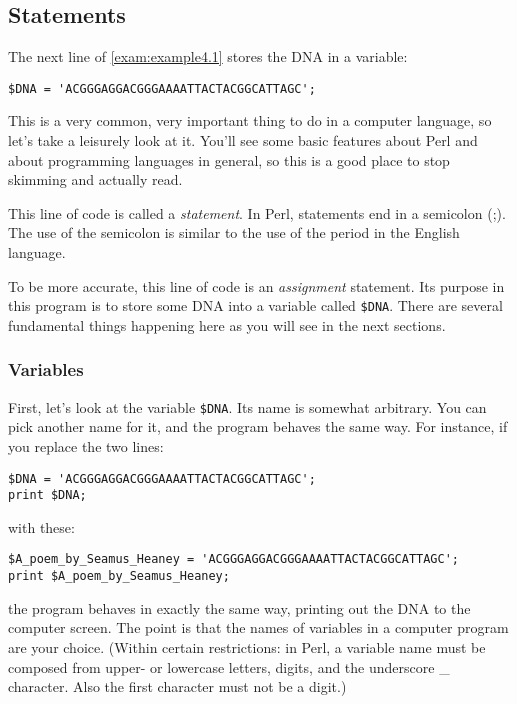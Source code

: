 \subsection{Statements}
The next line of \autoref{exam:example4.1} stores the DNA in a variable:

\begin{lstlisting}
$DNA = 'ACGGGAGGACGGGAAAATTACTACGGCATTAGC';
\end{lstlisting}

This is a very common, very important thing to do in a computer language, so let's take a leisurely look at it. You'll see some basic features about Perl and about programming languages in general, so this is a good place to stop skimming and actually read.

This line of code is called a \textit{statement}. In Perl, statements end in a semicolon (;). The use of the semicolon is similar to the use of the period in the English language.

To be more accurate, this line of code is an \textit{assignment} statement. Its purpose in this program is to store some DNA into a variable called \verb|$DNA|. There are several fundamental things happening here as you will see in the next sections. 

\subsubsection{Variables}
First, let's look at the variable \verb|$DNA|. Its name is somewhat arbitrary. You can pick another name for it, and the program behaves the same way. For instance, if you replace the two lines:

\begin{lstlisting}
$DNA = 'ACGGGAGGACGGGAAAATTACTACGGCATTAGC';
print $DNA;
\end{lstlisting}

with these:

\begin{lstlisting}
$A_poem_by_Seamus_Heaney = 'ACGGGAGGACGGGAAAATTACTACGGCATTAGC';
print $A_poem_by_Seamus_Heaney;
\end{lstlisting}

the program behaves in exactly the same way, printing out the DNA to the computer screen. The point is that the names of variables in a computer program are your choice. (Within certain restrictions: in Perl, a variable name must be composed from upper- or lowercase letters, digits, and the underscore \_ character. Also the first character must not be a digit.)

